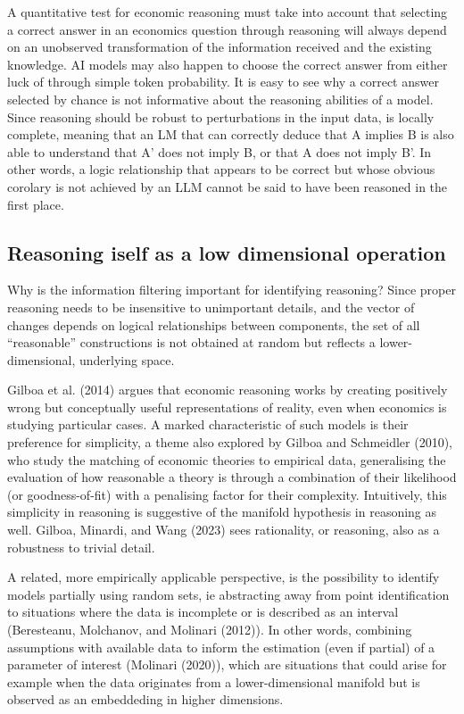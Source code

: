 \documentclass[
]{article}
\theoremstyle{plain}
\theoremstyle{definition}
\theoremstyle{remark}
\begin{document}
A quantitative test for economic reasoning must take into account that
selecting a correct answer in an economics question through reasoning
will always depend on an unobserved transformation of the information
received and the existing knowledge. AI models may also happen to choose
the correct answer from either luck of through simple token probability.
It is easy to see why a correct answer selected by chance is not
informative about the reasoning abilities of a model. Since reasoning
should be robust to perturbations in the input data, is locally
complete, meaning that an LM that can correctly deduce that A implies B
is also able to understand that A' does not imply B, or that A does not
imply B'. In other words, a logic relationship that appears to be
correct but whose obvious corolary is not achieved by an LLM cannot be
said to have been reasoned in the first place.

\subsection{Reasoning iself as a low dimensional
operation}\label{reasoning-iself-as-a-low-dimensional-operation}

Why is the information filtering important for identifying reasoning?
Since proper reasoning needs to be insensitive to unimportant details,
and the vector of changes depends on logical relationships between
components, the set of all ``reasonable'' constructions is not obtained
at random but reflects a lower-dimensional, underlying space.

Gilboa et al. (2014) argues that economic reasoning works by creating
positively wrong but conceptually useful representations of reality,
even when economics is studying particular cases. A marked
characteristic of such models is their preference for simplicity, a
theme also explored by Gilboa and Schmeidler (2010), who study the
matching of economic theories to empirical data, generalising the
evaluation of how reasonable a theory is through a combination of their
likelihood (or goodness-of-fit) with a penalising factor for their
complexity. Intuitively, this simplicity in reasoning is suggestive of
the manifold hypothesis in reasoning as well. Gilboa, Minardi, and Wang
(2023) sees rationality, or reasoning, also as a robustness to trivial
detail.

A related, more empirically applicable perspective, is the possibility
to identify models partially using random sets, ie abstracting away from
point identification to situations where the data is incomplete or is
described as an interval (Beresteanu, Molchanov, and Molinari (2012)).
In other words, combining assumptions with available data to inform the
estimation (even if partial) of a parameter of interest (Molinari
(2020)), which are situations that could arise for example when the data
originates from a lower-dimensional manifold but is observed as an
embeddeding in higher dimensions.
\end{document}
